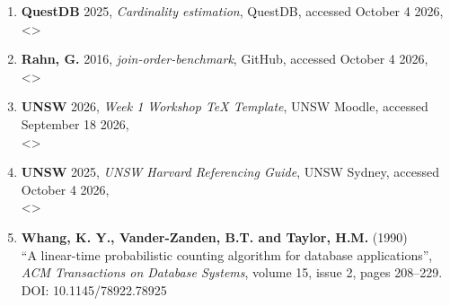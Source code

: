 \begin{enumerate}[label={\arabic*}, noitemsep]
    \item \label{questdb2025} \textbf{QuestDB} 2025, \textsl{Cardinality estimation}, QuestDB, accessed October 4 2026, \\ <>
    \item \label{rahn2016} \textbf{Rahn, G.} 2016, \textsl{join-order-benchmark}, GitHub, accessed October 4 2026, \\ <>
    \item \label{unsw2026} \textbf{UNSW} 2026, \textsl{Week 1 Workshop TeX Template}, UNSW Moodle, accessed September 18 2026, \\ <>
    \item \label{unsw2025} \textbf{UNSW} 2025, \textsl{UNSW Harvard Referencing Guide}, UNSW Sydney, accessed October 4 2026, \\ <>
    \item \label{whang1990} \textbf{Whang, K. Y., Vander-Zanden, B.T. and Taylor, H.M.} (1990) \\ ``A linear-time probabilistic counting algorithm for database applications'', \\ \textsl{ACM Transactions on Database Systems}, volume 15, issue 2, pages 208--229. \\ DOI: 10.1145/78922.78925
\end{enumerate}

